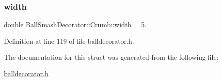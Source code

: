 \subsubsection{\texorpdfstring{width}{width}}
{\footnotesize\ttfamily double Ball\+Smash\+Decorator\+::\+Crumb\+::width = 5.}



Definition at line 119 of file balldecorator.\+h.



The documentation for this struct was generated from the following file\+:\begin{DoxyCompactItemize}
\item 
\mbox{\hyperlink{balldecorator_8h}{balldecorator.\+h}}\end{DoxyCompactItemize}
